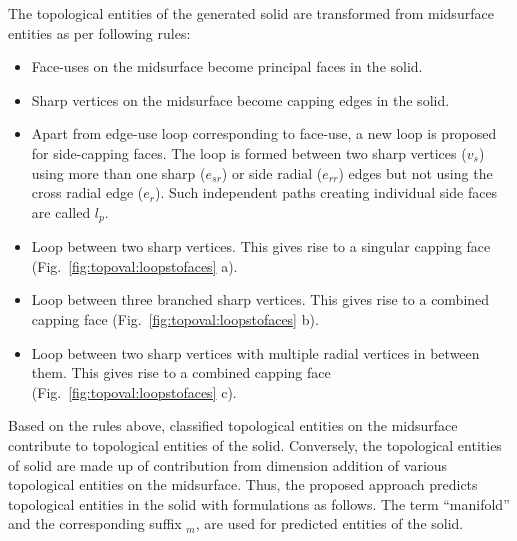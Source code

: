 The topological entities of the generated solid are transformed from midsurface entities as per following rules: %

\begin{itemize}
[noitemsep,topsep=2pt,parsep=2pt,partopsep=2pt,leftmargin=*]
\item Face-uses on the midsurface become principal faces in the solid.
 \item Sharp vertices on the midsurface become capping edges in the solid.
\item Apart from edge-use loop corresponding to face-use, a new loop is proposed for side-capping faces. The loop is formed between two sharp vertices ($v_s$) using  more than one sharp  ($e_{sr}$) or side radial ($e_{rr}$) edges but not using the cross radial edge ($e_r$). Such independent paths creating individual side faces are called $l_p$.
\item Loop between two sharp vertices. This gives rise to a singular capping face  (Fig.~\ref{fig:topoval:loopstofaces} a).
\item Loop between three branched sharp vertices. This gives rise to a combined capping face (Fig.~\ref{fig:topoval:loopstofaces}  b).
\item Loop between two sharp vertices with multiple radial vertices in between them. This gives rise to a combined capping face (Fig.~\ref{fig:topoval:loopstofaces}  c).
\end{itemize}
	
%
%


Based on the rules above, classified topological entities on the midsurface contribute to topological entities of the solid. Conversely, the topological entities of solid are made up of contribution from dimension addition of various topological entities on the midsurface. Thus, the proposed approach predicts topological entities in the solid with formulations as follows. The term ``manifold'' and the corresponding suffix $_m$,  are used for predicted entities of the solid. %

